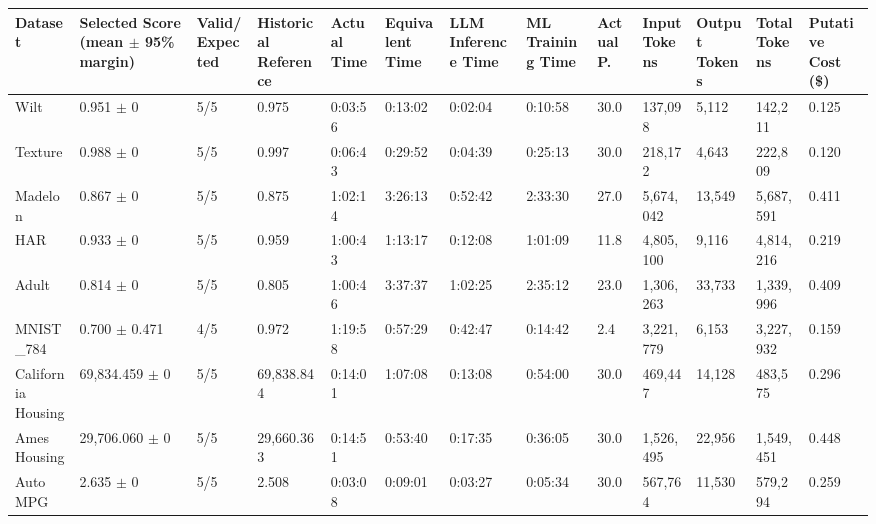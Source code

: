 \begin{tabular}{lllllllllllll}
\hline
Dataset & Selected Score (mean \ensuremath{\pm} 95\% margin) & Valid/Expected & Historical Reference & Actual Time & Equivalent Time & LLM Inference Time & ML Training Time & Actual P. & Input Tokens & Output Tokens & Total Tokens & Putative Cost (\$) \\
\hline
Wilt & 0.951 \ensuremath{\pm} 0 & 5/5 & 0.975 & 0:03:56 & 0:13:02 & 0:02:04 & 0:10:58 & 30.0 & 137,098 & 5,112 & 142,211 & 0.125 \\
Texture & 0.988 \ensuremath{\pm} 0 & 5/5 & 0.997 & 0:06:43 & 0:29:52 & 0:04:39 & 0:25:13 & 30.0 & 218,172 & 4,643 & 222,809 & 0.120 \\
Madelon & 0.867 \ensuremath{\pm} 0 & 5/5 & 0.875 & 1:02:14 & 3:26:13 & 0:52:42 & 2:33:30 & 27.0 & 5,674,042 & 13,549 & 5,687,591 & 0.411 \\
HAR & 0.933 \ensuremath{\pm} 0 & 5/5 & 0.959 & 1:00:43 & 1:13:17 & 0:12:08 & 1:01:09 & 11.8 & 4,805,100 & 9,116 & 4,814,216 & 0.219 \\
Adult & 0.814 \ensuremath{\pm} 0 & 5/5 & 0.805 & 1:00:46 & 3:37:37 & 1:02:25 & 2:35:12 & 23.0 & 1,306,263 & 33,733 & 1,339,996 & 0.409 \\
MNIST\_784 & 0.700 \ensuremath{\pm} 0.471 & 4/5 & 0.972 & 1:19:58 & 0:57:29 & 0:42:47 & 0:14:42 & 2.4 & 3,221,779 & 6,153 & 3,227,932 & 0.159 \\
California Housing & 69,834.459 \ensuremath{\pm} 0 & 5/5 & 69,838.844 & 0:14:01 & 1:07:08 & 0:13:08 & 0:54:00 & 30.0 & 469,447 & 14,128 & 483,575 & 0.296 \\
Ames Housing & 29,706.060 \ensuremath{\pm} 0 & 5/5 & 29,660.363 & 0:14:51 & 0:53:40 & 0:17:35 & 0:36:05 & 30.0 & 1,526,495 & 22,956 & 1,549,451 & 0.448 \\
Auto MPG & 2.635 \ensuremath{\pm} 0 & 5/5 & 2.508 & 0:03:08 & 0:09:01 & 0:03:27 & 0:05:34 & 30.0 & 567,764 & 11,530 & 579,294 & 0.259 \\
\hline
\end{tabular}
